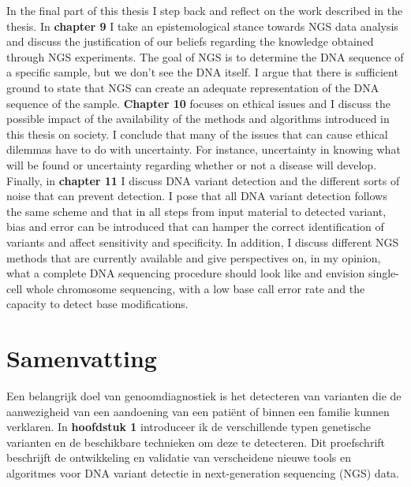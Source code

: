 \begin{appendices}
	In the final part of this thesis I step back and reflect on the work described in the thesis. In \textbf{chapter 9} I take an epistemological stance towards NGS data analysis and discuss the justification of our beliefs regarding the knowledge obtained through NGS experiments. The goal of NGS is to determine the DNA sequence of a specific sample, but we don’t see the DNA itself. I argue that there is sufficient ground to state that NGS can create an adequate representation of the DNA  sequence of the sample. \textbf{Chapter 10} focuses on ethical issues and I discuss the possible impact of the availability of the methods and algorithms introduced in this thesis on society. I conclude that many of the issues that can cause ethical dilemmas have to do with uncertainty. For instance, uncertainty in knowing what will be found or uncertainty regarding whether or not a disease will develop. Finally, in \textbf{chapter 11} I discuss DNA variant detection and the different sorts of noise that can prevent detection. I pose that all DNA variant detection follows the same scheme and that in all steps from input material to detected variant, bias and error can be introduced that can hamper the correct identification of variants and affect sensitivity and specificity. In addition, I discuss different NGS methods that are currently available and give perspectives on, in my opinion, what a complete DNA sequencing procedure should look like and envision single-cell whole chromosome sequencing, with a low base call error rate and the capacity to detect base modifications.

	
	\chapter{Samenvatting}
	Een belangrijk doel van genoomdiagnostiek is het detecteren van varianten die de aanwezigheid van een aandoening van een patiënt of binnen een familie kunnen verklaren. In \textbf{hoofdstuk 1} introduceer ik de verschillende typen genetische varianten en de beschikbare technieken om deze te detecteren. Dit proefschrift beschrijft de ontwikkeling en validatie van verscheidene nieuwe tools en algoritmes voor DNA variant detectie in next-generation sequencing (NGS) data.
	

\end{appendices}
